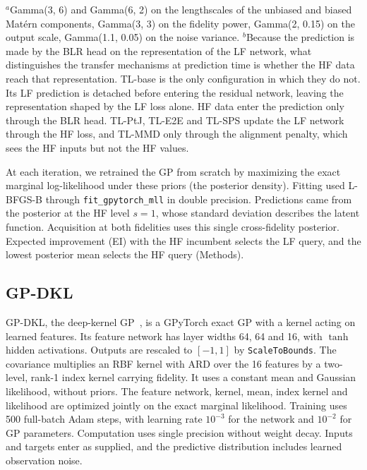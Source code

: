 \begin{table}[p]
{\begin{tabular}
\bottomrule
\end{tabular}}
\par\smallskip
{\fontsize{6.6bp}{7.4bp}\selectfont $^{a}$Gamma(3, 6) and Gamma(6, 2) on the lengthscales of the unbiased and biased Mat\'{e}rn components, Gamma(3, 3) on the fidelity power, Gamma(2, 0.15) on the output scale, Gamma(1.1, 0.05) on the noise variance. $^{b}$Because the prediction is made by the BLR head on the representation of the LF network, what distinguishes the transfer mechanisms at prediction time is whether the HF data reach that representation. TL-base is the only configuration in which they do not. Its LF prediction is detached before entering the residual network, leaving the representation shaped by the LF loss alone. HF data enter the prediction only through the BLR head. TL-PtJ, TL-E2E and TL-SPS update the LF network through the HF loss, and TL-MMD only through the alignment penalty, which sees the HF inputs but not the HF values.}
\end{table}

At each iteration, we retrained the GP from scratch by maximizing the exact marginal log-likelihood under these priors (the posterior density). Fitting used L-BFGS-B through \texttt{fit\_gpytorch\_mll} in double precision. Predictions came from the posterior at the HF level $s=1$, whose standard deviation describes the latent function. Acquisition at both fidelities uses this single cross-fidelity posterior. Expected improvement (EI) with the HF incumbent selects the LF query, and the lowest posterior mean selects the HF query (Methods).

\subsection{GP-DKL}

GP-DKL, the deep-kernel GP~\citep{wilson2016deep}, is a GPyTorch exact GP with a kernel acting on learned features. Its feature network has layer widths 64, 64 and 16, with $\tanh$ hidden activations. Outputs are rescaled to $[-1, 1]$ by \texttt{ScaleToBounds}. The covariance multiplies an RBF kernel with ARD over the 16 features by a two-level, rank-1 index kernel carrying fidelity. It uses a constant mean and Gaussian likelihood, without priors. The feature network, kernel, mean, index kernel and likelihood are optimized jointly on the exact marginal likelihood. Training uses 500 full-batch Adam steps, with learning rate $10^{-3}$ for the network and $10^{-2}$ for GP parameters. Computation uses single precision without weight decay. Inputs and targets enter as supplied, and the predictive distribution includes learned observation noise.

